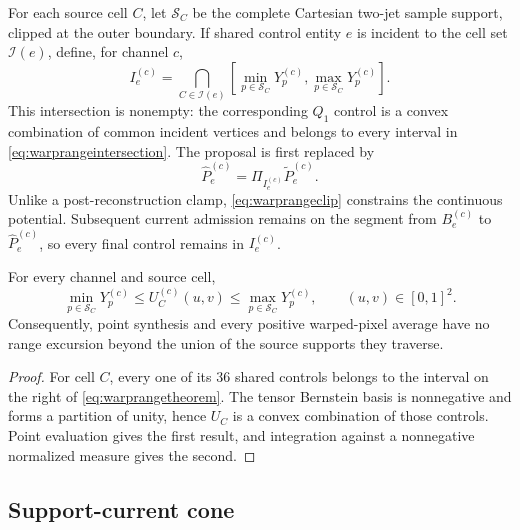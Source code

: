 For each source cell \(C\), let \(\mathcal S_C\) be the complete Cartesian
two-jet sample support, clipped at the outer boundary.  If shared control
entity \(e\) is incident to the cell set \(\mathcal I(e)\), define, for
channel \(c\),
\begin{equation}
 I_e^{(c)}=
 \bigcap_{C\in\mathcal I(e)}
 \left[
  \min_{p\in\mathcal S_C}Y_p^{(c)},
  \max_{p\in\mathcal S_C}Y_p^{(c)}
 \right].
 \label{eq:warprangeintersection}
\end{equation}
This intersection is nonempty: the corresponding \(Q_1\) control is a
convex combination of common incident vertices and belongs to every interval
in \eqref{eq:warprangeintersection}.  The proposal is first replaced by
\begin{equation}
 \widehat P_e^{(c)}=\Pi_{I_e^{(c)}}\widetilde P_e^{(c)}.
 \label{eq:warprangeclip}
\end{equation}
Unlike a post-reconstruction clamp, \eqref{eq:warprangeclip} constrains the
continuous potential.  Subsequent current admission remains on the segment
from \(B_e^{(c)}\) to \(\widehat P_e^{(c)}\), so every final control remains
in \(I_e^{(c)}\).

\begin{theorem}
For every channel and source cell,
\begin{equation}
 \min_{p\in\mathcal S_C}Y_p^{(c)}
 \leq U_C^{(c)}(u,v)\leq
 \max_{p\in\mathcal S_C}Y_p^{(c)},
 \qquad (u,v)\in[0,1]^2.
 \label{eq:warprangetheorem}
\end{equation}
Consequently, point synthesis and every positive warped-pixel average have no
range excursion beyond the union of the source supports they traverse.
\end{theorem}

\begin{proof}
For cell \(C\), every one of its 36 shared controls belongs to the interval
on the right of \eqref{eq:warprangetheorem}.  The tensor Bernstein basis is
nonnegative and forms a partition of unity, hence \(U_C\) is a convex
combination of those controls.  Point evaluation gives the first result, and
integration against a nonnegative normalized measure gives the second.
\end{proof}

\subsection{Support-current cone}


